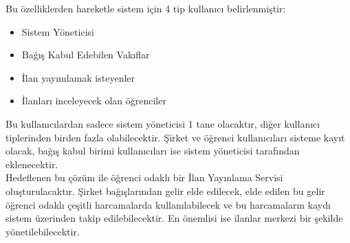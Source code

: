 Bu özelliklerden hareketle sistem için 4 tip kullanıcı belirlenmiştir:
\begin{itemize}
    \item Sistem Yöneticisi
    \item Bağış Kabul Edebilen Vakıflar
    \item İlan yayımlamak isteyenler 
    \item İlanları inceleyecek olan öğrenciler
\end{itemize}

Bu kullanıcılardan sadece sistem yöneticisi 1 tane olacaktır, diğer kullanıcı tiplerinden
birden fazla olabilecektir. Şirket ve öğrenci kullanıcıları sisteme kayıt olacak, bağış
kabul birimi kullanıcıları ise sistem yöneticisi tarafından eklenecektir. \\
Hedeflenen bu çözüm ile öğrenci odaklı bir İlan Yayınlama Servisi oluşturulacaktır.
Şirket bağışlarından gelir elde edilecek, elde edilen bu gelir öğrenci odaklı çeşitli
harcamalarda kullanılabilecek ve bu harcamaların kaydı sistem üzerinden takip
edilebilecektir. En önemlisi ise ilanlar merkezi bir şekilde yönetilebilecektir.
